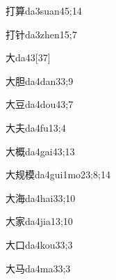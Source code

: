 \begin{verbete}{打算}{da3suan4}{5;14}
\end{verbete}

\begin{verbete}{打针}{da3zhen1}{5;7}
\end{verbete}

\begin{verbete}{大}{da4}{3}[37]
\end{verbete}

\begin{verbete}{大胆}{da4dan3}{3;9}
\end{verbete}

\begin{verbete}{大豆}{da4dou4}{3;7}
\end{verbete}

\begin{verbete}{大夫}{da4fu1}{3;4}
\end{verbete}

\begin{verbete}{大概}{da4gai4}{3;13}
\end{verbete}

\begin{verbete}{大规模}{da4gui1mo2}{3;8;14}
\end{verbete}

\begin{verbete}{大海}{da4hai3}{3;10}
\end{verbete}

\begin{verbete}{大家}{da4jia1}{3;10}
\end{verbete}

\begin{verbete}{大口}{da4kou3}{3;3}
\end{verbete}

\begin{verbete}{大马}{da4ma3}{3;3}
\end{verbete}


